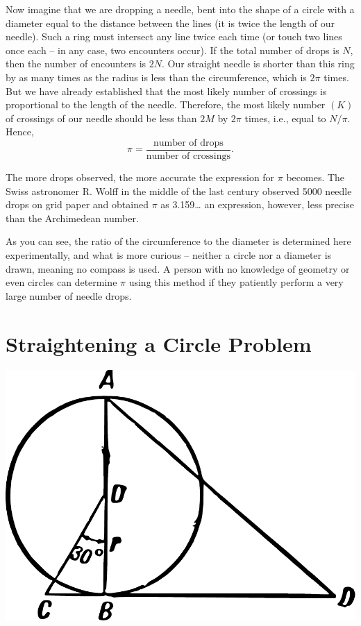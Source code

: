 Now imagine that we are dropping a needle, bent into the shape of a circle with a diameter equal to the distance between the lines (it is twice the length of our needle). Such a ring must intersect any line twice each time (or touch two lines once each -- in any case, two encounters occur). If the total number of drops is $N$, then the number of encounters is $2N$. Our straight needle is shorter than this ring by as many times as the radius is less than the circumference, which is $2\pi$ times. But we have already established that the most likely number of crossings is proportional to the length of the needle. Therefore, the most likely number $(K)$ of crossings of our needle should be less than $2M$ by $2\pi$ times, i.e., equal to $N/\pi$. Hence,
\begin{equation*}%
 \pi = \frac{\text{number of drops}}{\text{number of crossings}}.\end{equation*}

The more drops observed, the more accurate the expression for $\pi$ becomes. The Swiss astronomer R. Wolff in the middle of the last century observed 5000 needle drops on grid paper and obtained $\pi$ as 3.159\dots{} an expression, however, less precise than the Archimedean number.

As you can see, the ratio of the circumference to the diameter is determined here experimentally, and what is more curious -- neither a circle nor a diameter is drawn, meaning no compass is used. A person with no knowledge of geometry or even circles can determine $\pi$ using this method if they patiently perform a very large number of needle drops.


\section{Straightening a Circle Problem}
\label{sec-9.5}

\begin{marginfigure}
\centering
\includegraphics[width=\textwidth]{figures/ch-09/fig-125.pdf}
\end{marginfigure}

